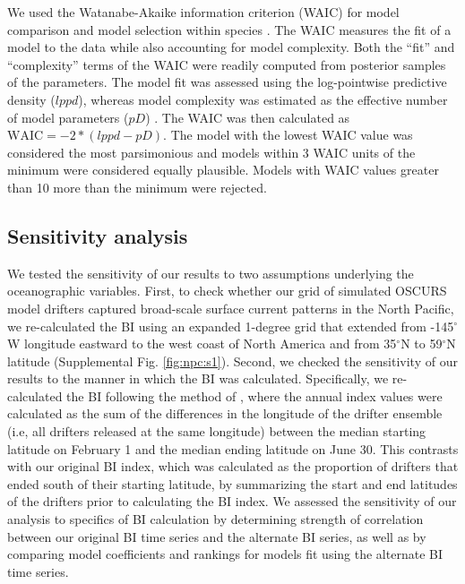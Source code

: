We used the Watanabe-Akaike information criterion (WAIC) for model comparison
and model selection within species \citep{Watanabe2010, Gelman2013a}. The WAIC
measures the fit of a model to the data while also accounting for model
complexity. Both the ``fit'' and ``complexity'' terms of the WAIC were readily
computed from posterior samples of the parameters. The model fit was assessed
using the log-pointwise predictive density (\(lppd\)), whereas model complexity
was estimated as the effective number of model parameters (\(pD\))
\citep{Watanabe2010, Gelman2013a}. The WAIC was then calculated as \(\text{WAIC}
= -2 * (lppd - pD)\). The model with the lowest WAIC value was considered the
most parsimonious and models within 3 WAIC units of the minimum were considered
equally plausible. Models with WAIC values greater than 10 more than the minimum
were rejected.


\subsection{Sensitivity analysis}

We tested the sensitivity of our results to two assumptions underlying the
oceanographic variables. First, to check whether our grid of simulated OSCURS
model drifters captured broad-scale surface current patterns in the North
Pacific, we re-calculated the BI using an expanded 1-degree grid that extended
from -145$^{\circ}$W longitude eastward to the west coast of North America and
from 35$^{\circ}$N to 59$^{\circ}$N latitude (Supplemental Fig.
\ref{fig:npc:s1}). Second, we checked the sensitivity of our results to the
manner in which the BI was calculated. Specifically, we re-calculated the BI
following the method of \citet{Watters2008a}, where the annual index values were
calculated as the sum of the differences in the longitude of the drifter
ensemble (i.e, all drifters released at the same longitude) between the median
starting latitude on February 1 and the median ending latitude on June 30. This
contrasts with our original BI index, which was calculated as the proportion of
drifters that ended south of their starting latitude, by summarizing the start
and end latitudes of the drifters prior to calculating the BI index. We assessed
the sensitivity of our analysis to specifics of BI calculation by determining
strength of correlation between our original BI time series and the alternate BI
series, as well as by comparing model coefficients and rankings for models fit
using the alternate BI time series.


